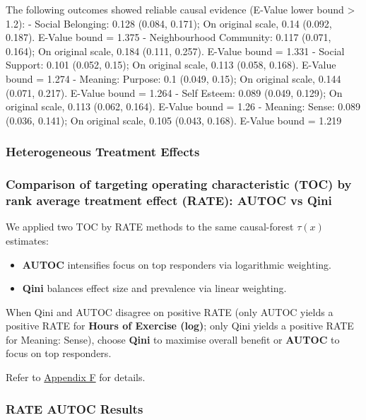 \documentclass[
  single column]{article}
\begin{document}
The following outcomes showed reliable causal evidence (E-Value lower
bound \textgreater{} 1.2): - Social Belonging: 0.128 (0.084, 0.171); On
original scale, 0.14 (0.092, 0.187). E-Value bound = 1.375 -
Neighbourhood Community: 0.117 (0.071, 0.164); On original scale, 0.184
(0.111, 0.257). E-Value bound = 1.331 - Social Support: 0.101 (0.052,
0.15); On original scale, 0.113 (0.058, 0.168). E-Value bound = 1.274 -
Meaning: Purpose: 0.1 (0.049, 0.15); On original scale, 0.144 (0.071,
0.217). E-Value bound = 1.264 - Self Esteem: 0.089 (0.049, 0.129); On
original scale, 0.113 (0.062, 0.164). E-Value bound = 1.26 - Meaning:
Sense: 0.089 (0.036, 0.141); On original scale, 0.105 (0.043, 0.168).
E-Value bound = 1.219

\newpage{}

\subsubsection{Heterogeneous Treatment
Effects}\label{heterogeneous-treatment-effects}

\subsubsection{Comparison of targeting operating characteristic (TOC) by
rank average treatment effect (RATE): AUTOC vs
Qini}\label{comparison-of-targeting-operating-characteristic-toc-by-rank-average-treatment-effect-rate-autoc-vs-qini}

We applied two TOC by RATE methods to the same causal-forest \(\tau(x)\)
estimates:

\begin{itemize}
\item
  \textbf{AUTOC} intensifies focus on top responders via logarithmic
  weighting.
\item
  \textbf{Qini} balances effect size and prevalence via linear
  weighting.
\end{itemize}

When Qini and AUTOC disagree on positive RATE (only AUTOC yields a
positive RATE for \textbf{Hours of Exercise (log)}; only Qini yields a
positive RATE for Meaning: Sense), choose \textbf{Qini} to maximise
overall benefit or \textbf{AUTOC} to focus on top responders.

Refer to \hyperref[appendix-cate-validation]{Appendix F} for details.

\subsubsection{RATE AUTOC Results}\label{rate-autoc-results}
\end{document}
